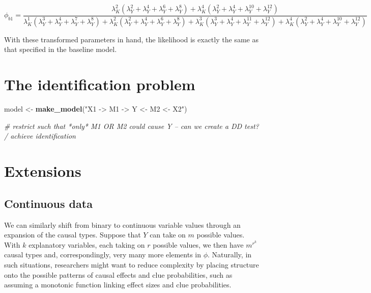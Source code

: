 \documentclass[12pt,]{book}
\newenvironment{Shaded}{\begin{snugshade}}{\end{snugshade}}
\newcommand{\CommentTok}[1]{\textcolor[rgb]{0.56,0.35,0.01}{\textit{#1}}}
\newcommand{\KeywordTok}[1]{\textcolor[rgb]{0.13,0.29,0.53}{\textbf{#1}}}
\newcommand{\NormalTok}[1]{#1}
\newcommand{\StringTok}[1]{\textcolor[rgb]{0.31,0.60,0.02}{#1}}
\begin{document}
\[\phi_{b1}=\frac{\lambda_K^2(\lambda_Y^2+\lambda_Y^4+\lambda_Y^6+\lambda_Y^8)+\lambda_K^4(\lambda_Y^2+\lambda_Y^4+\lambda_Y^{10}+\lambda_Y^{12})}{
\lambda_K^1(\lambda_Y^3+\lambda_Y^4+\lambda_Y^7+\lambda_Y^8)+\lambda_K^2(\lambda_Y^2+\lambda_Y^4+\lambda_Y^6+\lambda_Y^8)+\lambda_K^3(\lambda_Y^3+\lambda_Y^4+\lambda_Y^11+\lambda_Y^{12})+\lambda_K^4(\lambda_Y^2+\lambda_Y^4+\lambda_Y^{10}+\lambda_Y^{12})}\]

With these transformed parameters in hand, the likelihood is exactly the same as that specified in the baseline model.

\hypertarget{the-identification-problem}{%
\section{The identification problem}\label{the-identification-problem}}

\begin{Shaded}
\begin{Highlighting}[]
\NormalTok{model <-}\StringTok{ }\KeywordTok{make_model}\NormalTok{(}\StringTok{"X1 -> M1 -> Y <- M2 <- X2"}\NormalTok{)}

\CommentTok{# restrict such that *only* M1 OR M2 could cause Y -- can we create a DD test? / achieve identification}
\end{Highlighting}
\end{Shaded}

\hypertarget{extensions}{%
\section{Extensions}\label{extensions}}

\hypertarget{continuous-data}{%
\subsection{Continuous data}\label{continuous-data}}

We can similarly shift from binary to continuous variable values through an expansion of the causal types. Suppose that \(Y\) can take on \(m\) possible values. With \(k\) explanatory variables, each taking on \(r\) possible values, we then have \(m^{r^k}\) causal types and, correspondingly, very many more elements in \(\phi\). Naturally, in such situations, researchers might want to reduce complexity by placing structure onto the possible patterns of causal effects and clue probabilities, such as assuming a monotonic function linking effect sizes and clue probabilities.
\end{document}
